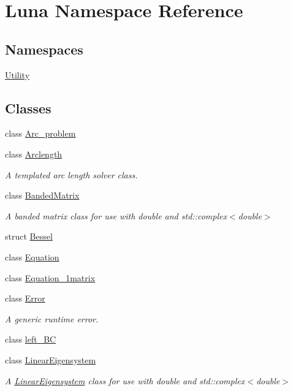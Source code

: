 \hypertarget{namespaceLuna}{}\section{Luna Namespace Reference}
\label{namespaceLuna}
\subsection*{Namespaces}
\begin{DoxyCompactItemize}
\item 
 \hyperlink{namespaceLuna_1_1Utility}{Utility}
\end{DoxyCompactItemize}
\subsection*{Classes}
\begin{DoxyCompactItemize}
\item 
class \hyperlink{classLuna_1_1Arc__problem}{Arc\+\_\+problem}
\item 
class \hyperlink{classLuna_1_1Arclength}{Arclength}
\begin{DoxyCompactList}\small\item\em A templated arc length solver class. \end{DoxyCompactList}\item 
class \hyperlink{classLuna_1_1BandedMatrix}{Banded\+Matrix}
\begin{DoxyCompactList}\small\item\em A banded matrix class for use with double and std\+::complex$<$double$>$ \end{DoxyCompactList}\item 
struct \hyperlink{structLuna_1_1Bessel}{Bessel}
\item 
class \hyperlink{classLuna_1_1Equation}{Equation}
\item 
class \hyperlink{classLuna_1_1Equation__1matrix}{Equation\+\_\+1matrix}
\item 
class \hyperlink{classLuna_1_1Error}{Error}
\begin{DoxyCompactList}\small\item\em A generic runtime error. \end{DoxyCompactList}\item 
class \hyperlink{classLuna_1_1left__BC}{left\+\_\+\+BC}
\item 
class \hyperlink{classLuna_1_1LinearEigensystem}{Linear\+Eigensystem}
\begin{DoxyCompactList}\small\item\em A \hyperlink{classLuna_1_1LinearEigensystem}{Linear\+Eigensystem} class for use with double and std\+::complex$<$double$>$ \end{DoxyCompactList}\item 

\end{DoxyCompactItemize}
